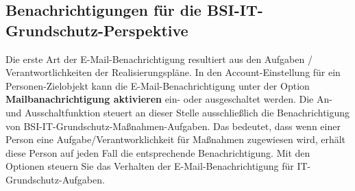 \documentclass[a4paper,10pt]{book}
\begin{document}
\subsection{Benachrichtigungen für die BSI-IT-Grundschutz-Per\-spek\-ti\-ve}
Die erste Art der E-Mail-Benachrichtigung resultiert aus den Aufgaben / Ver\-ant\-wort\-lich\-kei\-ten der Realisierungspläne.
In den Account-Einstellung für ein Personen-Zielobjekt kann die E-Mail-Benach\-richtigung unter der Option \textbf{Mailbanachrichtigung aktivieren} ein- oder ausgeschaltet werden.
Die An- und Ausschaltfunktion steuert an dieser Stelle ausschließlich die Benachrichtigung von BSI-IT-Grundschutz-Maßnahmen-Aufgaben. Das bedeutet, dass wenn einer Person eine
Aufgabe/Verantworklichkeit für Maßnahmen zugewiesen wird, erhält diese Person auf jeden Fall die entsprechende Benachrichtigung. Mit den Optionen steuern Sie das
Verhalten der E-Mail-Benachrichtigung für IT-Grundschutz-Aufgaben.
\end{document}
